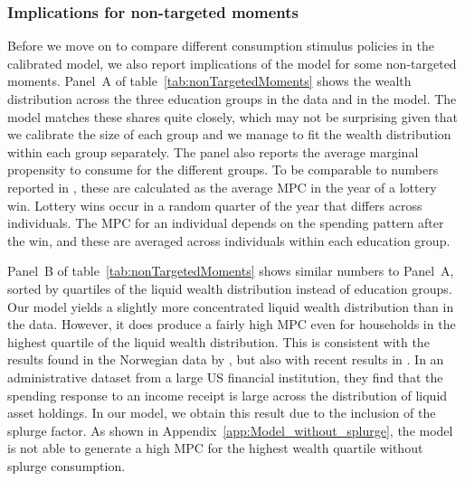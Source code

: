 \documentclass[\econtexRoot/HAFiscal]{subfiles}
\begin{document}
\hypertarget{non-targeted-moments}{}\par\subsubsection{Implications for non-targeted moments} 
\notinsubfile{\label{sec:nonTargetedMoments}}

Before we move on to compare different consumption stimulus policies in the calibrated model, we also report implications of the model for some non-targeted moments. Panel~A of table~\ref{tab:nonTargetedMoments} shows the wealth distribution across the three education groups in the data and in the model. The model matches these shares quite closely, which may not be surprising given that we calibrate the size of each group and we manage to fit the wealth distribution within each group separately. The panel also reports the average marginal propensity to consume for the different groups. To be comparable to numbers reported in \citet{fagereng_mpc_2021}, these are calculated as the average MPC in the year of a lottery win. Lottery wins occur in a random quarter of the year that differs across individuals. The MPC for an individual depends on the spending pattern after the win, and these are averaged across individuals within each education group. 

Panel~B of table~\ref{tab:nonTargetedMoments} shows similar numbers to Panel~A, sorted by quartiles of the liquid wealth distribution instead of education groups. Our model yields a slightly more concentrated liquid wealth distribution than in the data. However, it does produce a fairly high MPC even for households in the highest quartile of the liquid wealth distribution. This is consistent with the results found in the Norwegian data by \citet{fagereng_mpc_2021}, but also with recent results in \citet{graham2024mental}. In an administrative dataset from a large US financial institution, they find that the spending response to an income receipt is large across the distribution of liquid asset holdings. In our model, we obtain this result due to the inclusion of the splurge factor. As shown in Appendix~\ref{app:Model_without_splurge}, the model is not able to generate a high MPC for the highest wealth quartile without splurge consumption.  
\end{document}
